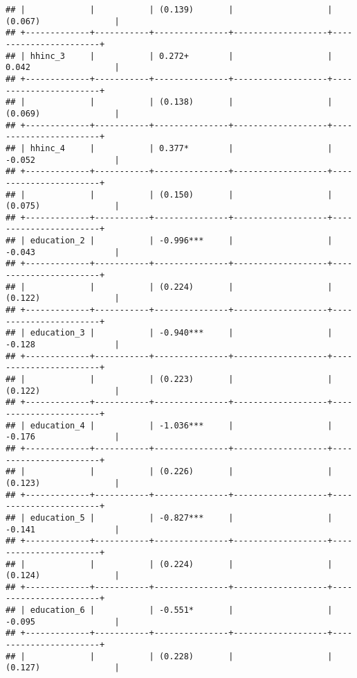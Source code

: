 \begin{verbatim}
## |             |           | (0.139)       |                   | (0.067)               |
## +-------------+-----------+---------------+-------------------+-----------------------+
## | hhinc_3     |           | 0.272+        |                   | 0.042                 |
## +-------------+-----------+---------------+-------------------+-----------------------+
## |             |           | (0.138)       |                   | (0.069)               |
## +-------------+-----------+---------------+-------------------+-----------------------+
## | hhinc_4     |           | 0.377*        |                   | -0.052                |
## +-------------+-----------+---------------+-------------------+-----------------------+
## |             |           | (0.150)       |                   | (0.075)               |
## +-------------+-----------+---------------+-------------------+-----------------------+
## | education_2 |           | -0.996***     |                   | -0.043                |
## +-------------+-----------+---------------+-------------------+-----------------------+
## |             |           | (0.224)       |                   | (0.122)               |
## +-------------+-----------+---------------+-------------------+-----------------------+
## | education_3 |           | -0.940***     |                   | -0.128                |
## +-------------+-----------+---------------+-------------------+-----------------------+
## |             |           | (0.223)       |                   | (0.122)               |
## +-------------+-----------+---------------+-------------------+-----------------------+
## | education_4 |           | -1.036***     |                   | -0.176                |
## +-------------+-----------+---------------+-------------------+-----------------------+
## |             |           | (0.226)       |                   | (0.123)               |
## +-------------+-----------+---------------+-------------------+-----------------------+
## | education_5 |           | -0.827***     |                   | -0.141                |
## +-------------+-----------+---------------+-------------------+-----------------------+
## |             |           | (0.224)       |                   | (0.124)               |
## +-------------+-----------+---------------+-------------------+-----------------------+
## | education_6 |           | -0.551*       |                   | -0.095                |
## +-------------+-----------+---------------+-------------------+-----------------------+
## |             |           | (0.228)       |                   | (0.127)               |

\end{verbatim}

